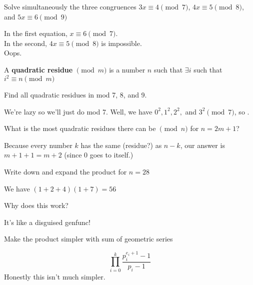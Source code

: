 \documentclass{scrartcl}
\begin{document}
\begin{exercise}
	Solve simultaneously the three congruences $3x \equiv 4 \pmod{7}$, $4x \equiv 5 \pmod{8}$, and $5x \equiv 6 \pmod {9}$
	\begin{soln}
		In the first equation, $x \equiv 6 \pmod{7}$. \\
		In the second, $4x \equiv 5 \pmod{8}$ is impossible.\\
		Oops.
	\end{soln}
\end{exercise}

\begin{definition*}
	A \textbf{quadratic residue} $\pmod{m}$ is a number $n$ such that $\exists i$ such that $i^2 \equiv n \pmod{m}$
\end{definition*}

\begin{exercise}
Find all quadratic residues in mod 7, 8, and 9.
	\begin{soln}
		We're lazy so we'll just do mod 7.
		Well, we have $0^2, 1^2, 2^2,$ and $3^2 \pmod{7}$, so .
	\end{soln}
\end{exercise}

\begin{exercise}
	What is the most quadratic residues there can be $\pmod{n}$ for $n=2m+1$?
	\begin{soln}
		Because every number $k$ has the same (residue?) as $n - k$, our answer is $m+1 + 1 = \boxed{m+2}$ (since 0 goes to itself.)
	\end{soln}
\end{exercise}

\setcounter{exercise}{9}

\begin{exercise}
	Write down and expand the product for $n=28$
	\begin{soln}
		We have $(1 + 2 + 4)(1 + 7) = 56$
	\end{soln}
\end{exercise}

\begin{exercise}
	Why does this work?
	\begin{soln}
		It's like a disguised genfunc!
	\end{soln}
\end{exercise}

\begin{exercise}
	Make the product simpler with sum of geometric series
	\begin{soln}
		\[\prod_{i = 0}^k \frac{p_i^{e_i + 1}-1}{p_i - 1}\]
		Honestly this isn't much simpler.
	\end{soln}
\end{exercise}
\end{document}
